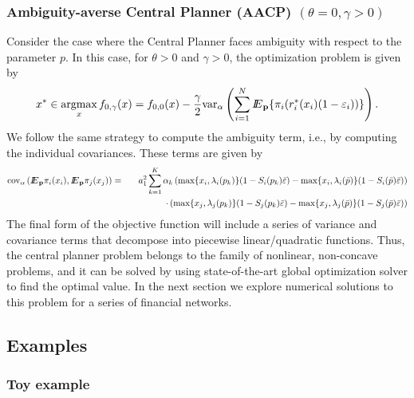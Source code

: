 \subsubsection{Ambiguity-averse Central Planner (AACP) $(\theta=0,\gamma>0)$}
Consider the case where the Central Planner faces ambiguity with respect to the parameter $p$.  In this case, for $\theta>0$ and $\gamma>0$, the optimization problem is given by
\begin{equation}\label{eq:aacp}
x^*\in\mathop{\rm argmax}_{x}  f_{0,\gamma}(x)= f_{0,0}(x) - \frac{\gamma}{2}{\mathop{\rm var}\nolimits}_{\alpha} \left(\sum_{i=1}^N {I\kern-.35em E}_{\bf p}\{\pi_i(r^*_i(x_i)(1-\varepsilon_i))\}\right).
\end{equation}
We follow the same strategy to compute the ambiguity term, i.e., by computing the individual covariances.  These terms are given by 
\begin{eqnarray*}
{\mathop{\rm cov}\nolimits}_\alpha\left({I\kern-.35em E}_{\bf p}\pi_i(x_i),{I\kern-.35em E}_{\bf p}\pi_j(x_j)\right)&=&a_1^2\sum_{k=1}^K \alpha_k \left(\max\{x_i,\lambda_i(p_k)\}(1-S_i(p_k)\bar{\varepsilon}) - \max\{x_i,\lambda_i(\bar{p})\}(1-S_i(\bar{p})\bar{\varepsilon}) \right)\\
&&\quad\quad\quad\quad\cdot\left(\max\{x_j,\lambda_j(p_k)\}(1-S_j(p_k)\bar{\varepsilon}) - \max\{x_j,\lambda_j(\bar{p})\}(1-S_j(\bar{p})\bar{\varepsilon}) \right)
\end{eqnarray*} 
The final form of the objective function will include a series of variance and covariance terms that decompose into piecewise linear/quadratic functions.  Thus, the central planner problem belongs to the family of nonlinear, non-concave problems, and it can be solved by using state-of-the-art global optimization solver to find the optimal value.  In the next section we explore numerical solutions to this problem for a series of financial networks.

\subsection{Examples}
\subsubsection{Toy example}
\subsubsection{}